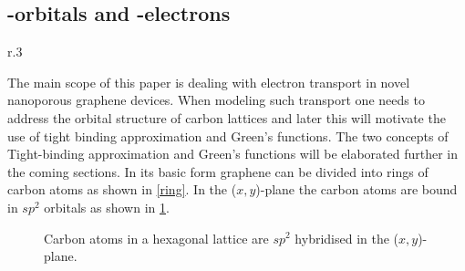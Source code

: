 \subsection{\mathinhead{\pi}{\pi}-orbitals and \mathinhead{\pi}{\pi}-electrons}
\begin{wrapfigure}[8]{r}{.3\textwidth}
	\vspace{-2.3em}
	\centering
	\caption{Graphene lattices consists of hexagonal arrangements of carbon atoms.}\label{ring}
\end{wrapfigure}
The main scope of this paper is dealing with electron transport in novel nanoporous graphene devices.
When modeling such transport one needs to address the orbital structure of carbon lattices and later this will motivate the use of tight binding approximation and Green's functions. The two concepts of Tight-binding approximation and Green's functions will be elaborated further in the coming sections.
In its basic form graphene can be divided into rings of carbon atoms as shown in \cref{ring}. In the (\(x,y\))-plane the carbon atoms are bound in \(sp^2\) orbitals as shown in \cref{sp2}.
\vspace{-2\baselineskip}
\begin{center}
\begin{figure}[H]
	\centering
	\caption{Carbon atoms in a hexagonal lattice are \(sp^2\) hybridised in the (\(x,y\))-plane.}\label{sp2}
\end{figure}
\end{center}
